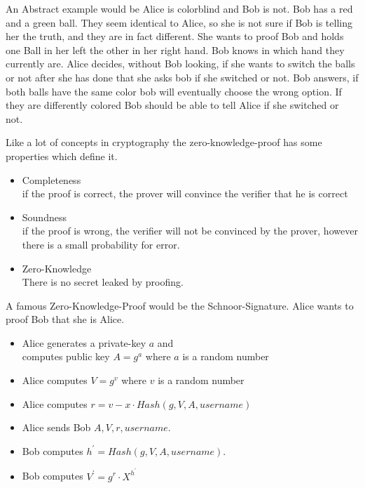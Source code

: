 \documentclass[journal]{IEEEtran}
\begin{document}
    An Abstract example would be Alice is colorblind and Bob is not. 
    Bob has a red and a green ball. They seem identical to Alice, so she is not sure if Bob is telling her the truth, and they are in fact different.
    She wants to proof Bob and holds one Ball in her left the other in her right hand. Bob knows in which hand they currently are.
    Alice decides, without Bob looking, if she wants to switch the balls or not after she has done that she asks bob if she switched or not.
    Bob answers, if both balls have the same color bob will eventually choose the wrong option. If they are differently colored Bob should be able to tell Alice if she switched or not.
    
    Like a lot of concepts in cryptography the zero-knowledge-proof has some properties which define it. 
    \cite{feige1988zero}
    \begin{itemize}[]
        \item Completeness \\
        if the proof is correct, the prover will convince the verifier that he is correct
        \item Soundness \\
        if the proof is wrong, the verifier will not be convinced by the prover, however there is a small probability for error.
        \item Zero-Knowledge \\
        There is no secret leaked by proofing.
    \end{itemize}
    A famous Zero-Knowledge-Proof would be the Schnoor-Signature. \cite{neven2009hash}
    Alice wants to proof Bob that she is Alice. 
    \begin{itemize}[] %
        \item Alice generates a private-key $a$ and \\
         computes public key $A = g^a$ where $a$ is a random number
        \item Alice computes $V = g^v$ where $v$ is a random number
        \item Alice computes $r = v-x \cdot Hash(g, V, A, username)$
        \item Alice sends Bob $A, V, r, username$.
        \item Bob computes $h^{\prime} = Hash(g , V, A, username)$. 
        \item Bob computes $V^{\prime} = g^{r} \cdot X^{h^{\prime}}$
    \end{itemize} 
\end{document}
